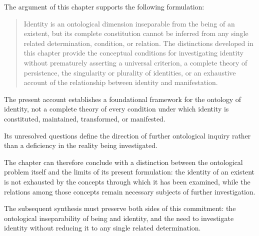 The argument of this chapter supports the following
formulation:

\begin{quote}
Identity is an ontological dimension inseparable from
the being of an existent, but its complete constitution
cannot be inferred from any single related determination,
condition, or relation. The distinctions developed in
this chapter provide the conceptual conditions for
investigating identity without prematurely asserting
a universal criterion, a complete theory of persistence,
the singularity or plurality of identities, or an
exhaustive account of the relationship between identity
and manifestation.
\end{quote}

The present account establishes a foundational framework
for the ontology of identity, not a complete theory of
every condition under which identity is constituted,
maintained, transformed, or manifested.

Its unresolved questions define the direction of further
ontological inquiry rather than a deficiency in the
reality being investigated.

The chapter can therefore conclude with a distinction
between the ontological problem itself and the limits
of its present formulation: the identity of an existent
is not exhausted by the concepts through which it has
been examined, while the relations among those concepts
remain necessary subjects of further investigation.

The subsequent synthesis must preserve both sides of
this commitment: the ontological inseparability of being
and identity, and the need to investigate identity
without reducing it to any single related determination.

